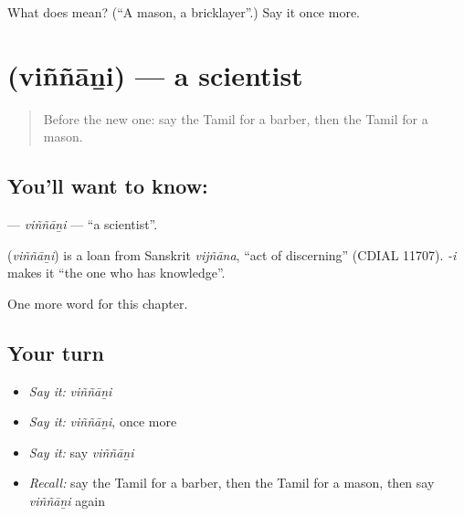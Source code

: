 \begin{tcolorbox}[breakable,colback=teal!4,colframe=teal!35!black,title={Before you move on}]
What does  mean? (\textquotedblleft{}A mason, a bricklayer\textquotedblright{}.) Say it once more.
\end{tcolorbox}
\section[\texorpdfstring{\ta{விஞ்ஞானி} (viññāṉi)}{விஞ்ஞானி (viññāṉi)}]{ (viññāṉi) — a scientist}

\label{lesson:TA-C224-vinnani}



\begin{quote}
Before the new one: say the Tamil for a barber, then the Tamil for a mason.
\end{quote}

\subsection*{You'll want to know: }
\textbf{} — \emph{viññāṉi} — \textquotedblleft{}a scientist\textquotedblright{}.

\begin{cousinweb}
\textbf{} (\emph{viññāṉi}) is a loan from Sanskrit \emph{vijñāna}, \textquotedblleft{}act of discerning\textquotedblright{} (CDIAL 11707). \emph{-i} makes it \textquotedblleft{}the one who has knowledge\textquotedblright{}.
\end{cousinweb}

\begin{grammarlens}[title={What you've built}]
One more word for this chapter.
\end{grammarlens}

\subsection*{Your turn}
\begin{itemize}
\raggedright
  \item \emph{Say it:} \emph{viññāṉi}
  \item \emph{Say it:} \emph{viññāṉi}, once more
  \item \emph{Say it:} say \emph{viññāṉi}
  \item \emph{Recall:} say the Tamil for a barber, then the Tamil for a mason, then say \emph{viññāṉi} again
\end{itemize}

